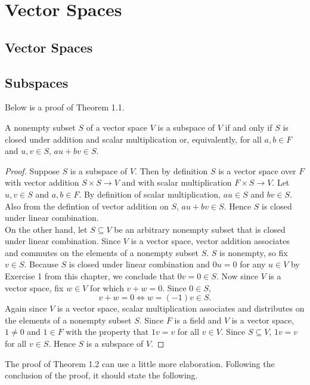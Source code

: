 \chapter{Vector Spaces}
\section{Vector Spaces}
\section{Subspaces}

Below is a proof of Theorem 1.1.

\begin{theorem}
\label{subspace}
A nonempty subset $S$ of a vector space $V$ is a subspace of $V$ if and only if $S$ is closed under addition and scalar multiplication or, equivalently, for all $a,b\in F$ and $u,v\in S$, $au+bv\in S$.
\end{theorem}

\begin{proof}
Suppose $S$ is a subspace of $V$. Then by definition $S$ is a vector space over $F$ with vector addition $S\times S\rightarrow V$ and with scalar multiplication $F\times S\rightarrow V$. Let $u,v\in S$ and $a,b\in F$. By definition of scalar multiplication, $au\in S$ and $bv\in S$. Also from the defintion of vector addition on $S$, $au+bv\in S$. Hence $S$ is closed under linear combination.\\

On the other hand, let $S\subseteq V$ be an arbitrary nonempty subset that is closed under linear combination. Since $V$ is a vector space, vector addition associates and commutes on the elements of a nonempty subset $S$. $S$ is nonempty, so fix $v\in S$. Because $S$ is closed under linear combination and $0u=0$ for any $u\in V$ by Exercise 1 from this chapter, we conclude that $0v=0\in S$. Now since $V$ is a vector space, fix $w\in V$ for which $v+w = 0$. Since $0\in S$, 
\[v + w = 0 \Leftrightarrow w = (-1)v \in S.\]
Again since $V$ is a vector space, scalar multiplication associates and distributes on the elements of a nonempty subset $S$. Since $F$ is a field and $V$ is a vector space, $1\neq 0$ and $1\in F$ with the property that $1v=v$ for all $v\in V$. Since $S\subseteq V$, $1v=v$ for all $v\in S$. Hence $S$ is a subspace of $V$.
\end{proof}

The proof of Theorem 1.2 can use a little more elaboration. Following the conclusion of the proof, it should state the following.

